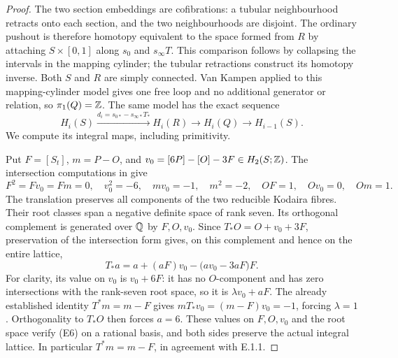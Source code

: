 \begin{proof}
The two section embeddings are cofibrations: a tubular neighbourhood
retracts onto each section, and the two neighbourhoods are disjoint.
The ordinary pushout is therefore homotopy equivalent to the space
formed from $R$ by attaching $S\times[0,1]$ along
$s_0$ and $s_\infty T$. This comparison follows by collapsing the
intervals in the mapping cylinder; the tubular retractions construct
its homotopy inverse. Both $S$ and $R$ are simply connected. Van
Kampen applied to this mapping-cylinder model gives one free loop
and no additional generator or relation, so $\pi_1(Q)=\mathbb Z$.
The same model has the exact sequence
\[
 H_i(S)\xrightarrow{d_i=s_{0*}-s_{\infty*}T_*}H_i(R)
 \longrightarrow H_i(Q)\longrightarrow H_{i-1}(S).             \tag{E4}
\]
We compute its integral maps, including primitivity.

Put $F=[S_t]$, $m=P-O$, and
$v_0=[6P]-[O]-3F\in H_2(S;\mathbb Z)$. The intersection computations in
\cite[Lemma 2.1]{E26} give
\[
 F^2=Fv_0=Fm=0,\quad v_0^2=-6,\quad mv_0=-1,\quad m^2=-2,
 \quad OF=1,\quad Ov_0=0,\quad Om=1.                         \tag{E5}
\]
The translation preserves all components of the two reducible
Kodaira fibres. Their root classes span a negative definite space of
rank seven. Its orthogonal complement is generated over $\mathbb Q$ by
$F,O,v_0$. Since $T_*O=O+v_0+3F$, preservation of the intersection
form gives, on this complement and hence on the entire lattice,
\[
 T_*a=a+(aF)v_0-\bigl(av_0-3aF\bigr)F.                       \tag{E6}
\]
For clarity, its value on $v_0$ is $v_0+6F$: it has no $O$-component
and has zero intersections with the rank-seven root space, so it is
$\lambda v_0+aF$. The already established identity $T^*m=m-F$ gives
$mT_*v_0=(m-F)v_0=-1$, forcing $\lambda=1$. Orthogonality to
$T_*O$ then forces $a=6$. These
values on $F,O,v_0$ and the root space verify (E6) on a rational basis,
and both sides preserve the actual integral lattice. In particular
$T^*m=m-F$, in agreement with E.1.1.


\end{proof}
